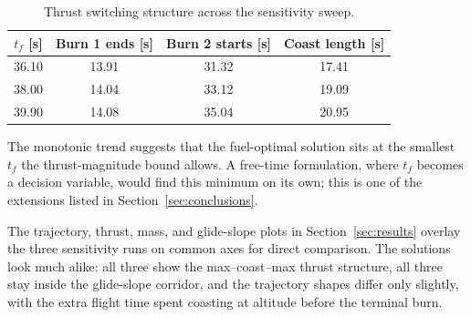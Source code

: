 \documentclass[../main.tex]{subfiles}
\begin{document}
\begin{table}[H]
\centering
\caption{Thrust switching structure across the sensitivity sweep.}
\label{tab:hm2_switch}
\begin{tabular}{cccc}
\toprule
$t_f$ [s] & Burn 1 ends [s] & Burn 2 starts [s] & Coast length [s] \\
\midrule
36.10 & 13.91 & 31.32 & 17.41 \\
38.00 & 14.04 & 33.12 & 19.09 \\
39.90 & 14.08 & 35.04 & 20.95 \\
\bottomrule
\end{tabular}
\end{table}

The monotonic trend suggests that the fuel-optimal solution sits at the smallest $t_f$ the thrust-magnitude bound allows. A free-time formulation, where $t_f$ becomes a decision variable, would find this minimum on its own; this is one of the extensions listed in Section~\ref{sec:conclusions}.

The trajectory, thrust, mass, and glide-slope plots in Section~\ref{sec:results} overlay the three sensitivity runs on common axes for direct comparison. The solutions look much alike: all three show the max--coast--max thrust structure, all three stay inside the glide-slope corridor, and the trajectory shapes differ only slightly, with the extra flight time spent coasting at altitude before the terminal burn.
\end{document}
